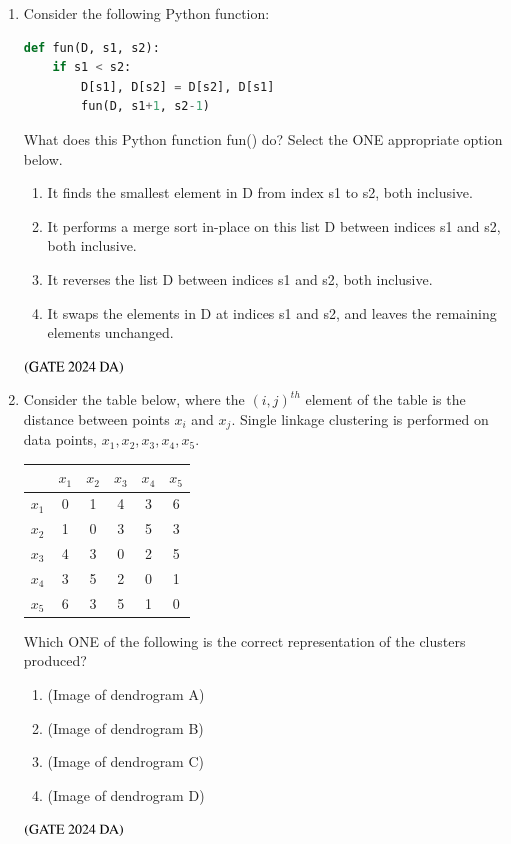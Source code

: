 \documentclass[journal,12pt,onecolumn]{IEEEtran}
\theoremstyle{remark}
\begin{document}
\begin{enumerate}[resume]
\item Consider the following Python function:
\begin{lstlisting}[language=Python]
def fun(D, s1, s2):
    if s1 < s2:
        D[s1], D[s2] = D[s2], D[s1]
        fun(D, s1+1, s2-1)
\end{lstlisting}
What does this Python function fun() do? Select the ONE appropriate option below.
\begin{enumerate}
\item It finds the smallest element in D from index s1 to s2, both inclusive.
\item It performs a merge sort in-place on this list D between indices s1 and s2, both inclusive.
\item It reverses the list D between indices s1 and s2, both inclusive.
\item It swaps the elements in D at indices s1 and s2, and leaves the remaining elements unchanged.
\end{enumerate}
\hfill $\left(\text{GATE 2024 DA}\right)$


\item Consider the table below, where the $(i,j)^{th}$ element of the table is the distance between points $x_i$ and $x_j$. Single linkage clustering is performed on data points, $x_1, x_2, x_3, x_4, x_5$.
\begin{center}
\begin{tabular}{c|ccccc}
 & $x_1$ & $x_2$ & $x_3$ & $x_4$ & $x_5$ \\
\hline
$x_1$ & 0 & 1 & 4 & 3 & 6 \\
$x_2$ & 1 & 0 & 3 & 5 & 3 \\
$x_3$ & 4 & 3 & 0 & 2 & 5 \\
$x_4$ & 3 & 5 & 2 & 0 & 1 \\
$x_5$ & 6 & 3 & 5 & 1 & 0 \\
\end{tabular}
\end{center}
Which ONE of the following is the correct representation of the clusters produced?
\begin{multicols}{2}
\begin{enumerate}
\item (Image of dendrogram A)
\item (Image of dendrogram B)
\item (Image of dendrogram C)
\item (Image of dendrogram D)
\end{enumerate}
\end{multicols}
\hfill $\left(\text{GATE 2024 DA}\right)$



\end{enumerate}
\end{document}

